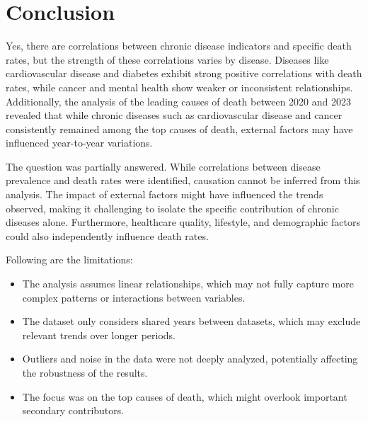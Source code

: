 \documentclass[a4paper,10pt]{article}
\begin{document}
\section{Conclusion}

Yes, there are correlations between chronic disease indicators and specific death rates, but the strength of these correlations varies by disease. Diseases like cardiovascular disease and diabetes exhibit strong positive correlations with death rates, while cancer and mental health show weaker or inconsistent relationships. Additionally, the analysis of the leading causes of death between 2020 and 2023 revealed that while chronic diseases such as cardiovascular disease and cancer consistently remained among the top causes of death, external factors may have influenced year-to-year variations.

\vspace{1em}

The question was partially answered. While correlations between disease prevalence and death rates were identified, causation cannot be inferred from this analysis. The impact of external factors might have influenced the trends observed, making it challenging to isolate the specific contribution of chronic diseases alone. Furthermore, healthcare quality, lifestyle, and demographic factors could also independently influence death rates.

\vspace{1em}

Following are the limitations:
\begin{itemize}
	\item The analysis assumes linear relationships, which may not fully capture more complex patterns or interactions between variables.
	\item The dataset only considers shared years between datasets, which may exclude relevant trends over longer periods.
	\item Outliers and noise in the data were not deeply analyzed, potentially affecting the robustness of the results.
	\item The focus was on the top causes of death, which might overlook important secondary contributors.
\end{itemize}








\end{document}
